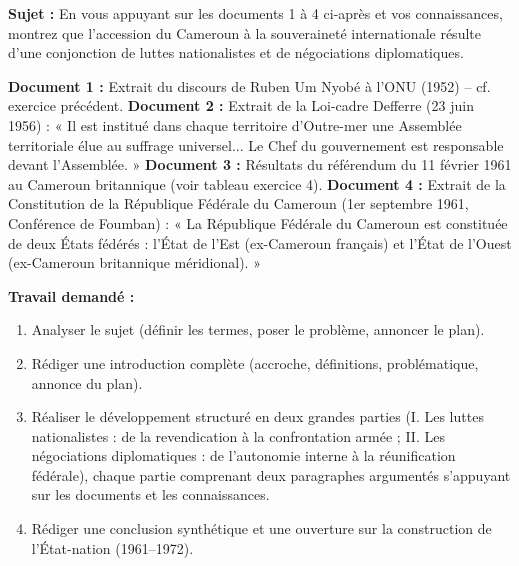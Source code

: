 \documentclass[11pt]{article}
\newcounter{popsec}
\newcounter{popsub}
\newcommand{\courssub}[1]{%
  \stepcounter{popsub}%
  \par\vspace{9pt}\noindent{\popxbold\fontsize{11.5}{13}\selectfont\color{popink}{\color{poporange}\thepopsec.\thepopsub}\hspace{6pt}#1}\par\nopagebreak\vspace{4pt}
}
\begin{document}
\courssub{Je me prépare au Bac}

\begin{exercice}
\textbf{Sujet :} En vous appuyant sur les documents 1 à 4 ci-après et vos connaissances, montrez que l'accession du Cameroun à la souveraineté internationale résulte d'une conjonction de luttes nationalistes et de négociations diplomatiques.

\textbf{Document 1 :} Extrait du discours de Ruben Um Nyobé à l'ONU (1952) -- cf. exercice précédent.
\textbf{Document 2 :} Extrait de la Loi-cadre Defferre (23 juin 1956) : « Il est institué dans chaque territoire d'Outre-mer une Assemblée territoriale élue au suffrage universel... Le Chef du gouvernement est responsable devant l'Assemblée. »
\textbf{Document 3 :} Résultats du référendum du 11 février 1961 au Cameroun britannique (voir tableau exercice 4).
\textbf{Document 4 :} Extrait de la Constitution de la République Fédérale du Cameroun (1er septembre 1961, Conférence de Foumban) : « La République Fédérale du Cameroun est constituée de deux États fédérés : l'État de l'Est (ex-Cameroun français) et l'État de l'Ouest (ex-Cameroun britannique méridional). »

\textbf{Travail demandé :}
\begin{enumerate}
\item Analyser le sujet (définir les termes, poser le problème, annoncer le plan).
\item Rédiger une introduction complète (accroche, définitions, problématique, annonce du plan).
\item Réaliser le développement structuré en deux grandes parties (I. Les luttes nationalistes : de la revendication à la confrontation armée ; II. Les négociations diplomatiques : de l'autonomie interne à la réunification fédérale), chaque partie comprenant deux paragraphes argumentés s'appuyant sur les documents et les connaissances.
\item Rédiger une conclusion synthétique et une ouverture sur la construction de l'État-nation (1961--1972).
\end{enumerate}
\end{exercice}
\end{document}
